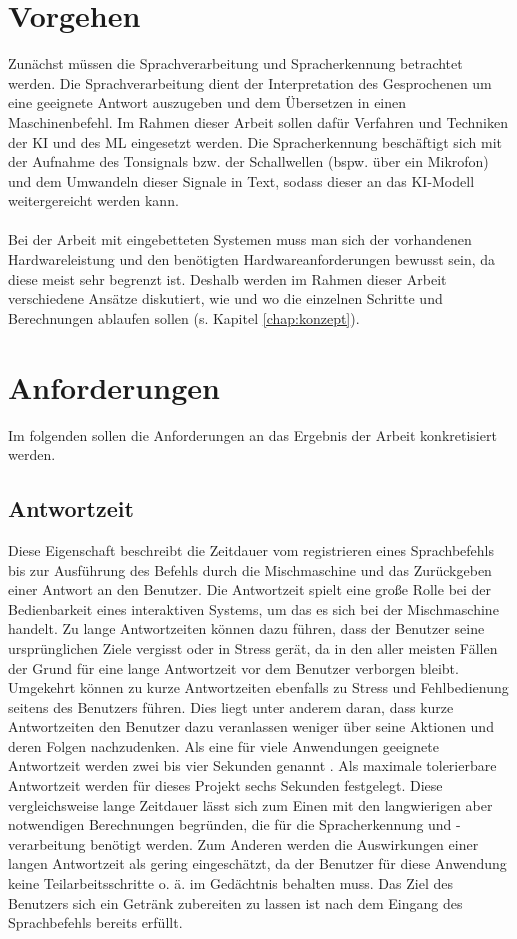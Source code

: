 \section{Vorgehen}
Zunächst müssen die Sprachverarbeitung und Spracherkennung betrachtet werden. Die Sprachverarbeitung dient der Interpretation des Gesprochenen um eine geeignete Antwort auszugeben und dem Übersetzen in einen Maschinenbefehl. Im Rahmen dieser Arbeit sollen dafür Verfahren und Techniken der \ac{KI} und des \ac{ML} eingesetzt werden. Die Spracherkennung beschäftigt sich mit der Aufnahme des Tonsignals bzw. der Schallwellen (bspw. über ein Mikrofon) und dem Umwandeln dieser Signale in Text, sodass dieser an das \ac{KI}-Modell weitergereicht werden kann.\\\\
Bei der Arbeit mit eingebetteten Systemen muss man sich der vorhandenen Hardwareleistung und den benötigten Hardwareanforderungen bewusst sein, da diese meist sehr begrenzt ist. Deshalb werden im Rahmen dieser Arbeit verschiedene Ansätze diskutiert, wie und wo die einzelnen Schritte und Berechnungen ablaufen sollen (s. Kapitel \ref{chap:konzept}).

\section{Anforderungen}
Im folgenden sollen die Anforderungen an das Ergebnis der Arbeit konkretisiert werden.
\subsection{Antwortzeit}
Diese Eigenschaft beschreibt die Zeitdauer vom registrieren eines Sprachbefehls bis zur Ausführung des Befehls durch die Mischmaschine und das Zurückgeben einer Antwort an den Benutzer. Die Antwortzeit spielt eine große Rolle bei der Bedienbarkeit eines interaktiven Systems, um das es sich bei der Mischmaschine handelt. Zu lange Antwortzeiten können dazu führen, dass der Benutzer seine ursprünglichen Ziele vergisst oder in Stress gerät, da in den aller meisten Fällen der Grund für eine lange Antwortzeit vor dem Benutzer verborgen bleibt. Umgekehrt können zu kurze Antwortzeiten ebenfalls zu Stress und Fehlbedienung seitens des Benutzers führen. Dies liegt unter anderem daran, dass kurze Antwortzeiten den Benutzer dazu veranlassen weniger über seine Aktionen und deren Folgen nachzudenken. Als eine für viele Anwendungen geeignete Antwortzeit werden zwei bis vier Sekunden genannt \cite{herczeg_9_2018}. Als maximale tolerierbare Antwortzeit werden für dieses Projekt sechs Sekunden festgelegt. Diese vergleichsweise lange Zeitdauer lässt sich zum Einen mit den langwierigen aber notwendigen Berechnungen begründen, die für die Spracherkennung und -verarbeitung benötigt werden. Zum Anderen werden die Auswirkungen einer langen Antwortzeit als gering eingeschätzt, da der Benutzer für diese Anwendung keine Teilarbeitsschritte o. ä. im Gedächtnis behalten muss. Das Ziel des Benutzers sich ein Getränk zubereiten zu lassen ist nach dem Eingang des Sprachbefehls bereits erfüllt.
